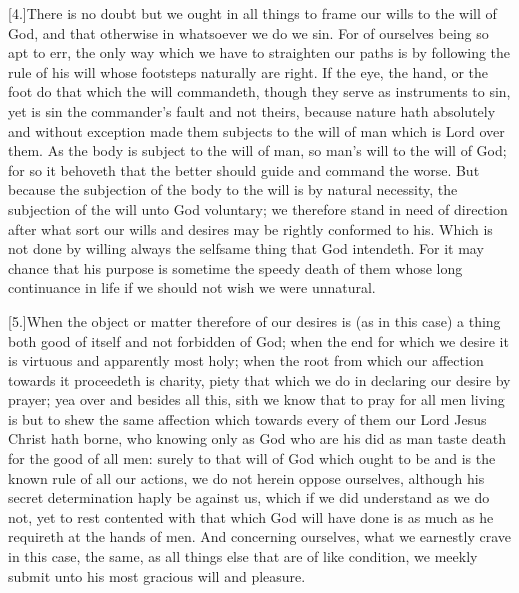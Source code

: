 [4.]There is no doubt but we ought in all things to frame our wills to the will of God, and that otherwise in whatsoever we do we sin. For of ourselves being so apt to err, the only way which we have to straighten our paths is by following the rule of his will whose footsteps naturally are right. If the eye, the hand, or the foot do that which the will commandeth, though they serve as instruments to sin, yet is sin the commander’s fault and not theirs, because nature hath absolutely and without exception made them subjects to the will of man which is Lord over them. As the body is subject to the will of man, so man’s will to the will of God; for so it behoveth that the better should guide and command the worse. But because the subjection of the body to the will is by natural  necessity, the subjection of the will unto God voluntary; we therefore stand in need of direction after what sort our wills and desires may be rightly conformed to his.
 Which is not done by willing always the selfsame thing that God intendeth. For it may chance that his purpose is sometime the speedy death of them whose long continuance in life if we should not wish we were unnatural.

[5.]When the object or matter therefore of our desires is (as in this case) a thing both good of itself and not forbidden of God; when the end for which we desire it is virtuous and apparently most holy; when the root from which our affection towards it proceedeth is charity, piety that which we do in declaring our desire by prayer; yea over and besides all this, sith we know that to pray for all men living is but to shew the same affection which towards every of them our Lord Jesus Christ hath borne, who knowing only as God who are his did as man taste death for the good of all men: surely to that will of God which ought to be and is the known rule of all our actions, we do not herein oppose ourselves, although his secret determination haply be against us, which if we did understand as we do not, yet to rest contented with that which God will have done is as much as he requireth at the hands of men. And concerning ourselves, what we earnestly crave in this case, the same, as all things else that are of like condition, we meekly submit unto his most gracious will and pleasure.

